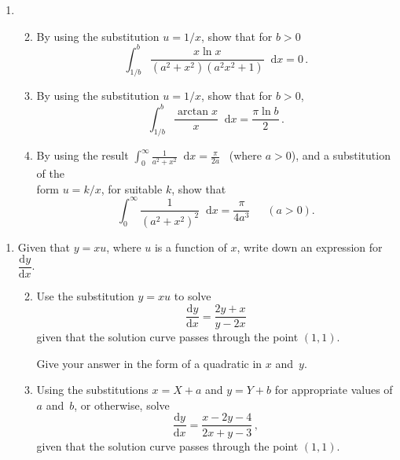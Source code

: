 \documentclass[a4, 11pt]{report}
\newlength{\qspace}
\newcounter{qnumber}
\newenvironment{question}%
 {\vspace{\qspace}
  \begin{enumerate}[\bfseries 1\quad][10]%
    \setcounter{enumi}{\value{qnumber}}%
    \item%
 }
{
  \end{enumerate}
  \filbreak
  \stepcounter{qnumber}
 }
\newenvironment{questionparts}[1][1]%
 {
  \begin{enumerate}[\bfseries (i)]%
    \setcounter{enumii}{#1}
    \addtocounter{enumii}{-1}
    \setlength{\itemsep}{5mm}
    \setlength{\parskip}{8pt}
 }
 {
  \end{enumerate}
 }
\renewcommand{\.}[1]{\ensuremath{\mathrm{#1}}}
\newcommand{\+}[1]{\ensuremath{\mathbf{#1}}}
\newcommand{\ud}{\mathop{}\!\mathrm{d}}
\begin{document}
\begin{question}
  \begin{questionparts}
  \item 
By using the substitution $u=1/x$, 
show that for
    $b>0$
    \[
    \int_{1/b}^b \frac{x \ln x}{(a^2+x^2)(a^2x^2+1)} \ud x =0 \,.
    \]

  \item 
By using the substitution $u=1/x$, 
show that for $b>0$,
    \[
    \int_{1/b}^b \frac{\arctan x}{x} \ud x = \frac{\pi \ln b} 2\,.
    \]

  \item 
By using the result 
$ \displaystyle \int_0^\infty \frac 1 {a^2+x^2} \ud x = \frac {\pi}{2 a} $
\ (where $a>0$),
and a substitution of the 
\\[5pt]
form $u=k/x$, for suitable $k$,
show that
    \[
    \int_0^\infty  \frac 1 {(a^2+x^2)^2} \ud x =  \frac {\pi}{4a^3 }
\, \ \ \ \ \ \ (a>0).
    \]
  \end{questionparts}
\end{question}

\begin{question}
  Given that $y=xu$, where $u$ is a function of $x$, write down an
  expression for $\dfrac {\.dy}{\.dx}$.

  \begin{questionparts}
  \item Use the substitution $y=xu$ to solve
    \[
    \frac {\.dy}{\.dx} = \frac {2y+x}{y-2x}
    \]
    given that the solution curve passes through the point $(1,1)$.

    Give your answer in the form of a quadratic in $x$ and~$y$.

  \item Using the substitutions $x=X+a$ and $y=Y+b$ for appropriate values
    of $a$ and~$b$, or otherwise, solve
    \[
    \frac {\.dy}{\.dx} = \frac {x-2y-4} {2x+y-3}\,,
    \]
    given that the solution curve passes through the point $(1,1)$.

  \end{questionparts}

\end{question}
	
\end{document}
